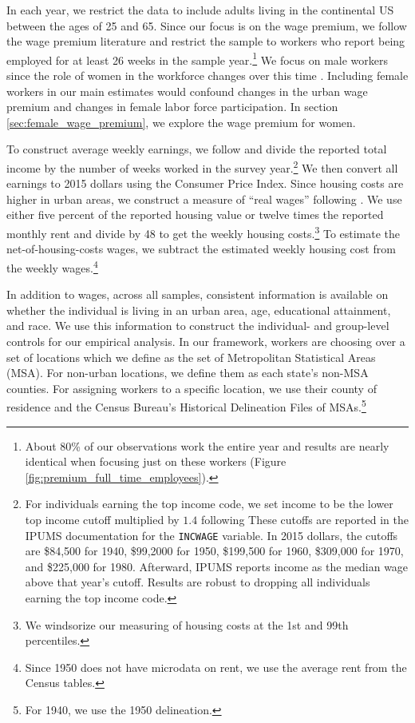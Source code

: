 \documentclass[12pt]{article}
\begin{document}
In each year, we restrict the data to include adults living in the continental US between the ages of 25 and 65. 
Since our focus is on the wage premium, we follow the wage premium literature and restrict the sample to workers who report being employed for at least 26 weeks in the sample year.\footnote{About 80\% of our observations work the entire year and results are nearly identical when focusing just on these workers (Figure \ref{fig:premium_full_time_employees}).}
We focus on male workers since the role of women in the workforce changes over this time \citep{goldin1990understanding}. 
Including female workers in our main estimates would confound changes in the urban wage premium and changes in female labor force participation. 
In section \ref{sec:female_wage_premium}, we explore the wage premium for women. 

To construct average weekly earnings, we follow \citet{goldin1992great} and divide the reported total income by the number of weeks worked in the survey year.\footnote{For individuals earning the top income code, we set income to be the lower top income cutoff multiplied by $1.4$ following \citet{goldin1992great} These cutoffs are reported in the IPUMS documentation for the \texttt{INCWAGE} variable. In 2015 dollars, the cutoffs are \$84,500 for 1940, \$99,2000 for 1950, \$199,500 for 1960, \$309,000 for 1970, and \$225,000 for 1980. Afterward, IPUMS reports income as the median wage above that year's cutoff. Results are robust to dropping all individuals earning the top income code.} 
We then convert all earnings to 2015 dollars using the Consumer Price Index.
Since housing costs are higher in urban areas, we construct a measure of ``real wages'' following \citet{ganong2017has}. 
We use either five percent of the reported housing value or twelve times the reported monthly rent and divide by 48 to get the weekly housing costs.\footnote{We windsorize our measuring of housing costs at the 1st and 99th percentiles.}
To estimate the net-of-housing-costs wages, we subtract the estimated weekly housing cost from the weekly wages.\footnote{Since 1950 does not have microdata on rent, we use the average rent from the Census tables.} 

In addition to wages, across all samples, consistent information is available on whether the individual is living in an urban area, age, educational attainment, and race.
We use this information to construct the individual- and group-level controls for our empirical analysis.
In our framework, workers are choosing over a set of locations which we define as the set of Metropolitan Statistical Areas (MSA). 
For non-urban locations, we define them as each state's non-MSA counties.
For assigning workers to a specific location, we use their county of residence and the Census Bureau's Historical Delineation Files of MSAs.\footnote{For 1940, we use the 1950 delineation.} 
\end{document}
